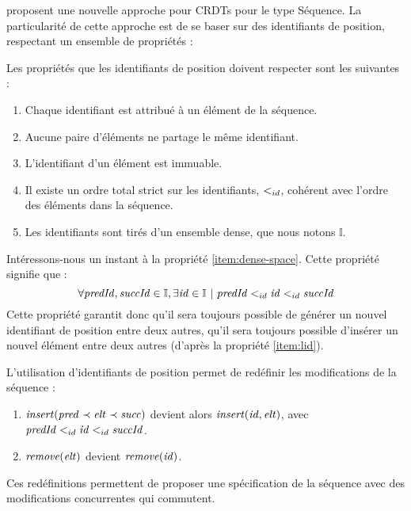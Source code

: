 \cite{2007-crdt-shapiro, 2009-treedoc-preguica} proposent une nouvelle approche pour \acp{CRDT} pour le type Séquence.
La particularité de cette approche est de se baser sur des identifiants de position, respectant un ensemble de propriétés :
\begin{definition}
  \label{def:dense-ids}
  Les propriétés que les identifiants de position doivent respecter sont les suivantes :
  \begin{enumerate}
    \item Chaque identifiant est attribué à un élément de la séquence.
    \item \label{item:uniqueness}
      Aucune paire d'éléments ne partage le même identifiant.
    \item L'identifiant d'un élément est immuable.
    \item \label{item:lid}
      Il existe un ordre total strict sur les identifiants, $<_{id}$, cohérent avec l'ordre des éléments dans la séquence.
    \item \label{item:dense-space}
      Les identifiants sont tirés d'un ensemble dense, que nous notons $\mathbb{I}$.
  \end{enumerate}
\end{definition}

Intéressons-nous un instant à la propriété \ref{item:dense-space}.
Cette propriété signifie que :
\begin{equation*}
  \forall \mathit{predId}, \mathit{succId} \in \mathbb{I}, \exists \mathit{id} \in \mathbb{I}~|~\mathit{predId} <_{id} \mathit{id} <_{id} \mathit{succId}
\end{equation*}
Cette propriété garantit donc qu'il sera toujours possible de générer un nouvel identifiant de position entre deux autres, \ie qu'il sera toujours possible d'insérer un nouvel élément entre deux autres (d'après la propriété \ref{item:lid}).

L'utilisation d'identifiants de position permet de redéfinir les modifications de la séquence :
\begin{enumerate}
  \item $\mathit{insert}(\mathit{pred} \prec \mathit{elt} \prec \mathit{succ})$ devient alors $\mathit{insert}(\mathit{id}, \mathit{elt})$, avec $\mathit{predId} <_{id} \mathit{id} <_{id} \mathit{succId}$.
  \item $\mathit{remove}(\mathit{elt})$ devient $\mathit{remove}(\mathit{id})$.
\end{enumerate}
Ces redéfinitions permettent de proposer une spécification de la séquence avec des modifications concurrentes qui commutent.

